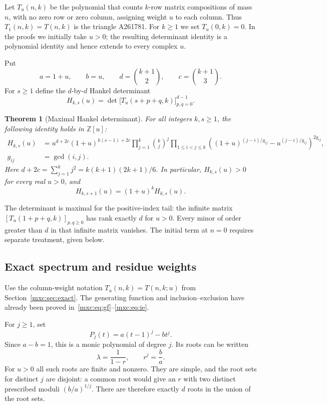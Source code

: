 \documentclass[11pt]{article}
\numberwithin{equation}{section}
\newtheorem{theorem}{Theorem}[section]
\theoremstyle{definition}
\theoremstyle{remark}
\begin{document}
Let $T_u(n,k)$ be the polynomial that counts $k$-row matrix compositions
of mass $n$, with no zero row or zero column, assigning weight $u$ to
each column.  Thus $T_1(n,k)=T(n,k)$ is the triangle A261781.  For
$k\geq1$ we set $T_u(0,k)=0$.  In the proofs we initially take $u>0$;
the resulting determinant identity is a polynomial identity and hence
extends to every complex $u$.

Put
\[
 a=1+u,\qquad b=u,\qquad
 d=\binom{k+1}{2},\qquad c=\binom{k+1}{3}.
\]
For $s\geq1$ define the $d$-by-$d$ Hankel determinant
\[
 H_{k,s}(u)=\det\bigl[T_u(s+p+q,k)\bigr]_{p,q=0}^{d-1}.
\]

\begin{theorem}[Maximal Hankel determinant]\label{mxc:thm:hankel}
For all integers $k,s\geq1$, the following identity holds in
$\mathbb Z[u]$:
\begin{align}
 H_{k,s}(u)
 &=u^{d+2c}(1+u)^{k(s-1)+2c}
   \prod_{j=1}^{k}\binom{k}{j}^{j}
   \prod_{1\leq i<j\leq k}
   \left((1+u)^{(j-i)/g_{ij}}-u^{(j-i)/g_{ij}}\right)^{2g_{ij}},
 \label{mxc:eq:weighted-hankel-product}\\
 g_{ij}&=\gcd(i,j).
 \nonumber
\end{align}
Here $d+2c=\sum_{j=1}^{k}j^2=k(k+1)(2k+1)/6$.
In particular, $H_{k,s}(u)>0$ for every real $u>0$, and
\[
 H_{k,s+1}(u)=(1+u)^kH_{k,s}(u).
\]
\end{theorem}

The determinant is maximal for the positive-index tail: the infinite
matrix $[T_u(1+p+q,k)]_{p,q\geq0}$ has rank exactly $d$ for $u>0$.
Every minor of order greater than $d$ in that infinite matrix vanishes.
The initial term at $n=0$ requires separate treatment, given below.

\subsection{Exact spectrum and residue weights}

Use the column-weight notation $T_u(n,k)=T(n,k;u)$ from
Section~\ref{mxc:sec:exact}. The generating function and inclusion--exclusion
have already been proved in~\eqref{mxc:eq:gf}--\eqref{mxc:eq:ie}.

For $j\geq1$, set
\[
 P_j(t)=a(t-1)^j-bt^j.
\]
Since $a-b=1$, this is a monic polynomial of degree $j$.  Its roots
can be written
\[
 \lambda=\frac{1}{1-r},\qquad r^j=\frac ba.
\]
For $u>0$ all such roots are finite and nonzero.  They are simple,
and the root sets for distinct $j$ are disjoint: a common root would
give an $r$ with two distinct prescribed moduli $(b/a)^{1/j}$.
There are therefore exactly $d$ roots in the union of the root sets.
\end{document}
